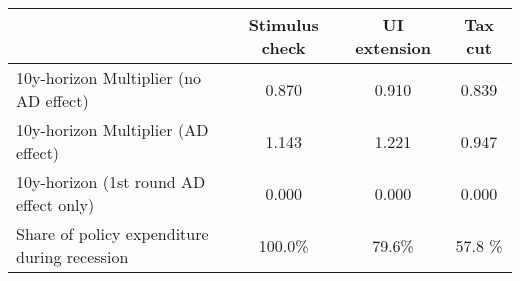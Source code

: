 \begin{tabular}{@{}lccc@{}} 
\toprule 
& Stimulus check    & UI extension    & Tax cut     \\  \midrule 
10y-horizon Multiplier (no AD effect) &0.870  & 0.910  & 0.839     \\ 
10y-horizon Multiplier (AD effect) &1.143  & 1.221  & 0.947     \\ 
10y-horizon (1st round AD effect only) &0.000  & 0.000  & 0.000     \\ 
Share of policy expenditure during recession &100.0\%  & 79.6\%  & 57.8 \%    \\ 
\end{tabular}  
